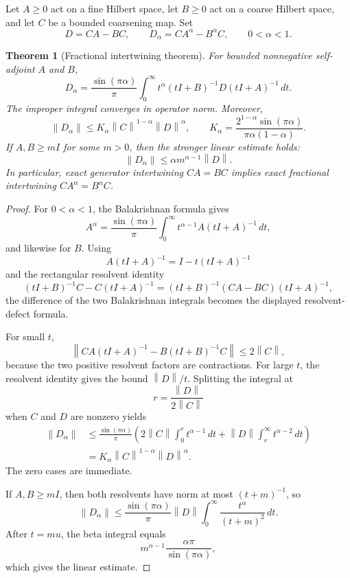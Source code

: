 \documentclass[11pt,letterpaper]{article}
\newtheorem{theorem}{Theorem}[section]
\theoremstyle{plain}
\theoremstyle{plain}
\theoremstyle{plain}
\theoremstyle{definition}
\theoremstyle{definition}
\theoremstyle{definition}
\theoremstyle{definition}
\theoremstyle{definition}
\theoremstyle{remark}
\theoremstyle{remark}
\theoremstyle{remark}
\theoremstyle{remark}
\theoremstyle{remark}
\newcommand{\norm}[1]{\left\lVert#1\right\rVert}
\theoremstyle{remark}
\begin{document}
Let $A\ge0$ act on a fine Hilbert space, let $B\ge0$ act on a coarse Hilbert space, and let $C$ be a bounded coarsening map.  Set
\[
D=CA-BC,
\qquad
D_\alpha=CA^\alpha-B^\alpha C,
\qquad 0<\alpha<1.
\]

\begin{theorem}[Fractional intertwining theorem]\label{core:record:033}\label{core:thm:fractional-naturality}
For bounded nonnegative self-adjoint $A$ and $B$,
\[
\boxed{
D_\alpha
=
\frac{\sin(\pi\alpha)}{\pi}
\int_0^\infty
 t^\alpha(tI+B)^{-1}D(tI+A)^{-1}\,dt.
}
\]
The improper integral converges in operator norm.  Moreover,
\[
\boxed{
\norm{D_\alpha}
\le
K_\alpha\norm{C}^{1-\alpha}\norm{D}^{\alpha},
\qquad
K_\alpha=
\frac{2^{1-\alpha}\sin(\pi\alpha)}
{\pi\alpha(1-\alpha)}.
}
\]
If $A,B\ge mI$ for some $m>0$, then the stronger linear estimate holds:
\[
\boxed{
\norm{D_\alpha}
\le
\alpha m^{\alpha-1}\norm{D}.
}
\]
In particular, exact generator intertwining $CA=BC$ implies exact fractional intertwining $CA^\alpha=B^\alpha C$.
\end{theorem}

\begin{proof}
For $0<\alpha<1$, the Balakrishnan formula gives
\[
A^\alpha
=
\frac{\sin(\pi\alpha)}{\pi}
\int_0^\infty t^{\alpha-1}A(tI+A)^{-1}\,dt,
\]
and likewise for $B$.  Using
\[
A(tI+A)^{-1}=I-t(tI+A)^{-1}
\]
and the rectangular resolvent identity
\[
(tI+B)^{-1}C-C(tI+A)^{-1}
=
(tI+B)^{-1}(CA-BC)(tI+A)^{-1},
\]
the difference of the two Balakrishnan integrals becomes the displayed resolvent-defect formula.

For small $t$,
\[
\norm{CA(tI+A)^{-1}-B(tI+B)^{-1}C}
\le 2\norm C,
\]
because the two positive resolvent factors are contractions.  For large $t$, the resolvent identity gives the bound $\norm D/t$.  Splitting the integral at
\[
r=\frac{\norm D}{2\norm C}
\]
when $C$ and $D$ are nonzero yields
\[
\begin{aligned}
\norm{D_\alpha}
&\le
\frac{\sin(\pi\alpha)}{\pi}
\left(
2\norm C\int_0^r t^{\alpha-1}\,dt
+
\norm D\int_r^\infty t^{\alpha-2}\,dt
\right)\\
&=
K_\alpha\norm C^{1-\alpha}\norm D^\alpha.
\end{aligned}
\]
The zero cases are immediate.

If $A,B\ge mI$, then both resolvents have norm at most $(t+m)^{-1}$, so
\[
\norm{D_\alpha}
\le
\frac{\sin(\pi\alpha)}{\pi}\norm D
\int_0^\infty\frac{t^\alpha}{(t+m)^2}\,dt.
\]
After $t=mu$, the beta integral equals
\[
m^{\alpha-1}\frac{\alpha\pi}{\sin(\pi\alpha)},
\]
which gives the linear estimate.
\end{proof}
\end{document}
